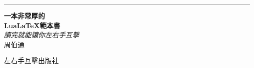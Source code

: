 \begin{titlepage} %

  \raggedleft %

  \rule{1pt}{\textheight} %
  \hspace{0.05\textwidth} %
  \parbox[b]{0.75\textwidth}{ %

    {\Huge\bfseries 一本非常厚的\\[0.5\baselineskip]{\sf\bf Lua\LaTeX}範本書}\\[2\baselineskip] %
    {\large\textit{讀完就能讓你左右手互擊}}\\[4\baselineskip] %
    {\Large\textsf{周伯通}} %

    \vspace{0.5\textheight} %

    {\noindent 左右手互擊出版社~~\plogo}\\[\baselineskip] %
  }

\end{titlepage}



